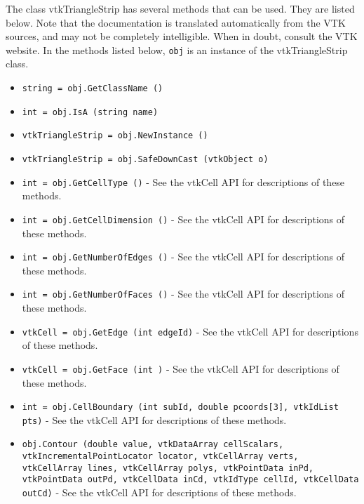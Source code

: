 The class vtkTriangleStrip has several methods that can be used.
  They are listed below.
Note that the documentation is translated automatically from the VTK sources,
and may not be completely intelligible.  When in doubt, consult the VTK website.
In the methods listed below, \verb|obj| is an instance of the vtkTriangleStrip class.
\begin{itemize}
\item  \verb|string = obj.GetClassName ()|

\item  \verb|int = obj.IsA (string name)|

\item  \verb|vtkTriangleStrip = obj.NewInstance ()|

\item  \verb|vtkTriangleStrip = obj.SafeDownCast (vtkObject o)|

\item  \verb|int = obj.GetCellType ()| -  See the vtkCell API for descriptions of these methods.

\item  \verb|int = obj.GetCellDimension ()| -  See the vtkCell API for descriptions of these methods.

\item  \verb|int = obj.GetNumberOfEdges ()| -  See the vtkCell API for descriptions of these methods.

\item  \verb|int = obj.GetNumberOfFaces ()| -  See the vtkCell API for descriptions of these methods.

\item  \verb|vtkCell = obj.GetEdge (int edgeId)| -  See the vtkCell API for descriptions of these methods.

\item  \verb|vtkCell = obj.GetFace (int )| -  See the vtkCell API for descriptions of these methods.

\item  \verb|int = obj.CellBoundary (int subId, double pcoords[3], vtkIdList pts)| -  See the vtkCell API for descriptions of these methods.

\item  \verb|obj.Contour (double value, vtkDataArray cellScalars, vtkIncrementalPointLocator locator, vtkCellArray verts, vtkCellArray lines, vtkCellArray polys, vtkPointData inPd, vtkPointData outPd, vtkCellData inCd, vtkIdType cellId, vtkCellData outCd)| -  See the vtkCell API for descriptions of these methods.


\end{itemize}
